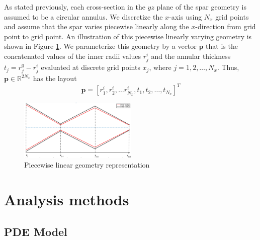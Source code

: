 \documentclass[11pt]{article}
\newcommand{\bs}[1] {\boldsymbol{#1}}
\begin{document}
As stated previously, each cross-section in the $yz$ plane of the
spar geometry is assumed to be a circular annulus. We discretize
the $x$-axis using $N_x$ grid points and assume that the spar
varies piecewise linearly along the $x$-direction from grid
point to grid point. An illustration of this piecewise linearly
varying geometry is shown in Figure \ref{fig:representation}.
We parameterize this geometry by a vector $\bs{p}$
that is the concatenated values of the
inner radii values $r^i_j$ and the annular thickness
$t_j = r^0_j - r^i_j$ evaluated at discrete grid points $x_j$,
where $j=1,2,\dots,N_x$. Thus, $\bs{p} \in \mathbb{R}^{2 N_x}$
has the layout
\begin{equation}
\bs{p} = [r^i_1, r^i_2, \dots r^i_{N_x}, t_1, t_2, \dots, t_{N_x}]^T
\end{equation}

\begin{figure}[hbt]
\centering
\includegraphics[width=0.5\textwidth]{representation}
\caption{Piecewise linear geometry representation}
\label{fig:representation}
\end{figure}

\section{Analysis methods}

\subsection{PDE Model}
\end{document}
